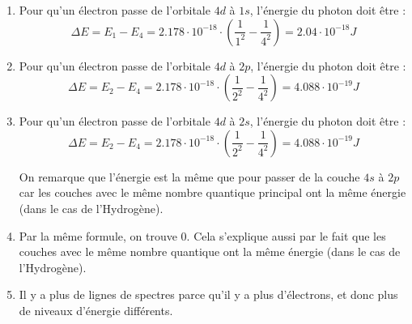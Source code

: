 \documentclass{article}
\begin{document}
\begin{enumerate}
	\item Pour qu'un électron passe de l'orbitale $4d$ à $1s$, l'énergie du photon doit être :
				$$\Delta E = E_1 - E_4 = 2.178 \cdot 10^{-18} \cdot (\frac{1}{1^2} - \frac{1}{4^2}) = 2.04 
				\cdot 10^{-18} J$$
	\item	Pour qu'un électron passe de l'orbitale $4d$ à $2p$, l'énergie du photon doit être :
				$$\Delta E = E_2 - E_4 = 2.178 \cdot 10^{-18} \cdot (\frac{1}{2^2} - \frac{1}{4^2}) = 4.088 
				\cdot 10^{-19} J$$
	\item Pour qu'un électron passe de l'orbitale $4d$ à $2s$, l'énergie du photon doit être :
				$$\Delta E = E_2 - E_4 = 2.178 \cdot 10^{-18} \cdot (\frac{1}{2^2} - \frac{1}{4^2}) = 4.088 
				\cdot 10^{-19} J$$
				
				On remarque que l'énergie est la même que pour passer de la couche $4s$ à $2p$ car les couches
				avec le même nombre quantique principal ont la même énergie (dans le cas de l'Hydrogène). %
	\item	Par la même formule, on trouve 0. Cela s'explique aussi par le fait que les couches avec le même 
				nombre quantique ont la même énergie (dans le cas de l'Hydrogène). %
	\item Il y a plus de lignes de spectres parce qu'il y a plus d'électrons, et donc plus de niveaux d'énergie différents.
\end{enumerate}
\end{document}
